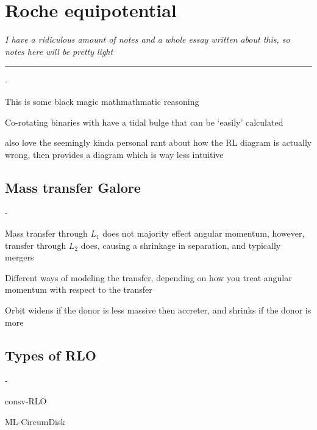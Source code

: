 \pagebreak
\chapter{Roche equipotential}
\textit{\small I have a ridiculous amount of notes and a whole essay written about this, so notes here will be pretty light}
\vspace{.1cm}
\hrule
\vspace{.5cm}

\begin{list}{-}{}
\item This is some black magic mathmathmatic reasoning 
\item Co-rotating binaries with have a tidal bulge that can be `easily' calculated
\item also love the seemingly kinda personal rant about how the RL diagram is actually wrong, then provides a diagram which is way less intuitive  
\end{list}

\section{Mass transfer Galore}
\begin{list}{-}{}
\item Mass transfer through \(L_1\) does not majority effect angular momentum, however, transfer through \(L_2\) does, causing a shrinkage in separation, and typically mergers
\item Different ways of modeling the transfer, depending on how you treat angular momentum with respect to the transfer
\item Orbit widens if the donor is less massive then accreter, and shrinks if the donor is more
\end{list}

\section{Types of RLO}
\begin{list}{-}{}
\item \gls{consv-RLO}
\item \gls{ML-CircumDisk}
\end{list}

